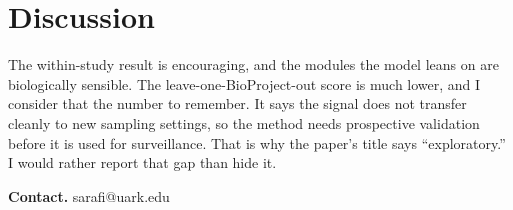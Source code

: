 \section{Discussion}
The within-study result is encouraging, and the modules the model leans on are biologically sensible. The leave-one-BioProject-out score is much lower, and I consider that the number to remember. It says the signal does not transfer cleanly to new sampling settings, so the method needs prospective validation before it is used for surveillance. That is why the paper's title says ``exploratory.'' I would rather report that gap than hide it.

\textbf{Contact.} sarafi@uark.edu

